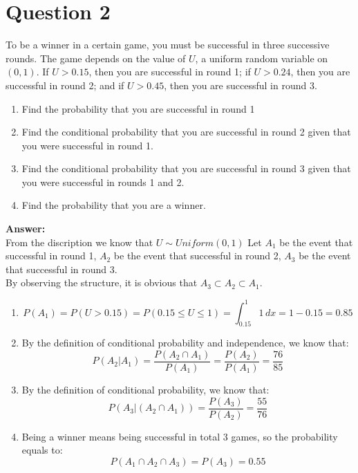 \documentclass[hidelinks]{article}
\begin{document}
\section{Question 2}
To be a winner in a certain game, you must be successful in three successive rounds.
The game depends on the value of $U$, a uniform random variable on $(0, 1)$. If $U > 0.15$, then you are successful in round 1; if $U > 0.24$, then you are successful in round 2; and
if $U > 0.45$, then you are successful in round 3.
\begin{enumerate}
    \item Find the probability that you are successful in round 1
    \item Find the conditional probability that you are successful in round 2 given that you were successful in round 1.
    \item Find the conditional probability that you are successful in round 3 given that you were successful in rounds 1 and 2.
    \item Find the probability that you are a winner.
\end{enumerate}

\textbf{Answer:}\\
From the discription we know that $U \sim Uniform(0,1)$
Let $A_1$ be the event that successful in round 1, $A_2$ be the event that successful in round 2, $A_3$ be the event that successful in round 3.\\
By observing the structure, it is obvious that $A_3 \subset A_2 \subset A_1$.
\begin{enumerate}
    \item $$ P(A_1) = P(U > 0.15) = P(0.15 \leq U \leq 1) = \int^1_{0.15}1 \, dx = 1 - 0.15 = 0.85$$
    \item By the definition of conditional probability and independence, we know that:
    $$P(A_2 | A_1) = \frac{P(A_2 \cap A_1)}{P(A_1)} = \frac{P(A_2)}{P(A_1)} = \frac{76}{85}$$
    \item By the definition of conditional probability, we know that:
    $$P(A_3 | (A_2 \cap A_1)) = \frac{P(A_3)}{P(A_2)} = \frac{55}{76}$$
    \item Being a winner means being successful in total 3 games, so the probability equals to:
    $$P(A_1 \cap A_2 \cap A_3) = P(A_3) = 0.55 $$
\end{enumerate}
\end{document}
